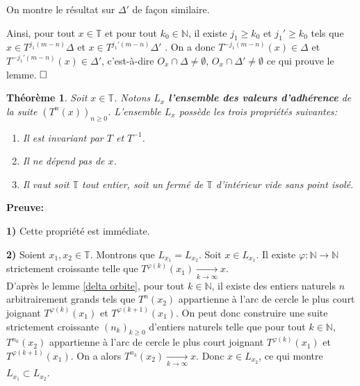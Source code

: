 \documentclass[11pt,a4 paper]{article}
\newtheorem{theoreme}{Théorème}[section]
\newcommand{\Tbb}{\mathbb{T}}
\newcommand{\Nbb}{\mathbb{N}}
\newenvironment{thm}{\begin{box_thm}\begin{theoreme}}{\end{theoreme}\end{box_thm}}
\begin{document}
	\par On montre le résultat sur $\Delta'$ de façon similaire.
	\par Ainsi, pour tout $x \in \Tbb$ et pour tout $k_0 \in \Nbb$,  il existe $j_1 \geq k_0$ et $j_1'\geq k_0$ tels que $x \in  T^{j_1(m-n)}\Delta$ et $x\in T^{j_1'(m-n)}\Delta'$ . On a donc $T^{-j_1(m-n)}(x) \in \Delta$ et $T^{-j_1'(m-n)}(x) \in \Delta'$, c'est-à-dire $O_x \cap \Delta \neq \emptyset$, $O_x \cap \Delta' \neq \emptyset$ ce qui prouve le lemme. $\hfill \square$\\
	














	
\begin{thm}\label{ensemble dérivé}
	Soit $x \in \Tbb$. Notons $L_x$ \textbf{l'ensemble des valeurs d'adhérence} de la suite $(T^n(x))_{n\geq0}$. L'ensemble $L_x$ possède les trois propriétés suivantes:
	\begin{enumerate}
			\item Il est invariant par $T$ et $T^{-1}$.
			\item Il ne dépend pas de $x$.
			\item Il vaut soit $\Tbb$ tout entier, soit un fermé de $\Tbb$ d'intérieur vide sans point isolé.
	\end{enumerate}
\end{thm}

	\textbf{Preuve:}
	\par \textbf{1)} Cette propriété est immédiate.\\
	
	
	\par \textbf{2)} Soient $x_1, x_2 \in \Tbb$. Montrons que $L_{x_1}=L_{x_2}$. Soit $x \in L_{x_1}$. Il existe $\varphi:\Nbb \to \Nbb$ strictement croissante telle que $T^{\varphi(k)}(x_1) \underset{k \to \infty}{\longrightarrow}x$.\\
	
	D'après le lemme \ref{delta orbite}, pour tout $k\in \Nbb$, il existe des entiers naturels $n$ arbitrairement grands tels que $T^{n}(x_2)$ appartienne à l'arc de cercle le plus court joignant $T^{\varphi(k)}(x_1)$ et $T^{\varphi(k+1)}(x_1)$. On peut donc construire une suite strictement croissante $(n_k)_{k\geq0}$ d'entiers naturels telle que pour tout $k \in \Nbb$, $T^{n_k}(x_2)$ appartienne à l'arc de cercle le plus court joignant $T^{\varphi(k)}(x_1)$ et $T^{\varphi(k+1)}(x_1)$. On a alors $T^{n_k}(x_2) \underset{k \to \infty}{\longrightarrow}x$. Donc $x\in L_{x_2}$, ce qui montre $L_{x_1}\subset L_{x_2}$.\\
	
\end{document}
